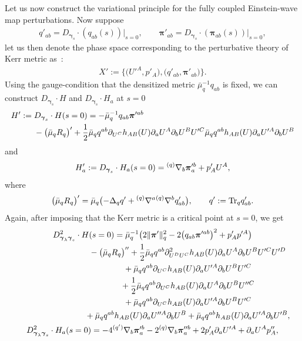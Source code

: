 \documentclass[11pt]{article}
\numberwithin{equation}{section}
\def\ptl{\partial}%
\def\mbo#1{\boldsymbol{#1}}%
\def\grad{{\nabla}}%
\newcommand{\leftexp}[2]{{\vphantom{#2}}^{#1}{#2}}
\def\halb{\frac{1}{2}}%
\numberwithin{equation}{section}
\begin{document}
 Let us now construct the variational principle for the fully coupled Einstein-wave map perturbations.
Now suppose
\begin{align*}
q'_{ab} = D_{\mbo{\gamma}_s} \cdot (q_{ab} (s)) \vert_{s=0}, \qquad \mbo{\pi}'_{ab} = D_{\mbo{\gamma}_s} \cdot (\mbo{\pi}_{ab} (s)) \vert_{s=0},
\end{align*}
let us then denote the phase space corresponding to the perturbative theory of Kerr metric as~:
\begin{align*}
X' := \bigl\{ \bigl(U'^{A}, p'_A\bigr), \bigl(q'_{ab}, \mbo{\pi}'_{ab}\bigr) \bigr\}.
\end{align*}
Using the gauge-condition that the densitized metric $\bar{\mu}^{-1}_q q_{ab}$ is fixed, we can construct $D_{\mbo{\gamma}_s} \cdot H $ and $D_{\mbo{\gamma}_s} \cdot H_a $ at $s=0$
\begin{align*}%
H':={}& D_{\mbo{\gamma}_s} \cdot H (s=0)=- \bar{\mu}^{-1}_q q_{ab} \mbo{\pi}'^{ab} \notag\\
 & - \bigl(\bar{\mu}_q R_q\bigr)'+ \halb \bar{\mu}_q q^{ab} \ptl_{U^C} h_{AB} (U) \ptl_a U^A \ptl_b U^B U'^C
\bar{\mu}_q q^{ab} h_{AB}(U) \ptl_a U'^A \ptl_b U^B
\end{align*}
and
\[
H'_a := D_{\mbo{\gamma}_s} \cdot H_a (s=0) = \leftexp{(q)}{\grad}_b \mbo{\pi}'^b_a + p'_A U^A,
\]
where
\[
\bigl(\bar{\mu}_q R_q\bigr)' = \bar{\mu}_q \bigl(- \Delta_q q' + \leftexp{(q)}{\grad}^a \leftexp{(q)}{\grad}^b q'_{ab} \bigr),\qquad q' := {\rm Tr}_q q'_{ab}.
\]
Again, after imposing that the Kerr metric is a critical point at $s=0$, we get
\begin{gather}
 D^2_{\mbo{\gamma}_\lambda \mbo{\gamma}_s} \cdot H(s=0) = \bar{\mu}^{-1}_q \bigl(2 \Vert \mbo{\pi}' \Vert_q^2 - 2\bigl(q_{ab} \mbo{\pi}'^{ab}\bigr)^2 + p'_A p'^A\bigr) \notag\\
 \hphantom{D^2_{\mbo{\gamma}_\lambda \mbo{\gamma}_s} \cdot H(s=0) =}{}
 - \bigl(\bar{\mu}_q R_q\bigr)'' + \halb \bar{\mu}_q q^{ab} \ptl^2_{U^D U^C} h_{AB}(U) \ptl_a U^A \ptl_b U^B U'^C U'^D \notag\\
 \hphantom{D^2_{\mbo{\gamma}_\lambda \mbo{\gamma}_s} \cdot H(s=0) =}{}
 + \bar{\mu}_q q^{ab} \ptl_{U^C} h_{AB}(U) \ptl_a U'^A \ptl_b U^B U'^C \notag\\
 \hphantom{D^2_{\mbo{\gamma}_\lambda \mbo{\gamma}_s} \cdot H(s=0) =}{}
 + \halb \bar{\mu}_q q^{ab} \ptl_{U^C} h_{AB}(U) \ptl_a U^A \ptl_b U^B U''^C \notag\\
 \hphantom{D^2_{\mbo{\gamma}_\lambda \mbo{\gamma}_s} \cdot H(s=0) =}{}
 + \bar{\mu}_q q^{ab} \ptl_{U^C} h_{AB} (U) \ptl_a U'^A \ptl_b U^B U'^C \notag\\
 \hphantom{D^2_{\mbo{\gamma}_\lambda \mbo{\gamma}_s} \cdot H(s=0) =}{}
 + \bar{\mu}_q q^{ab} h_{AB}(U) \ptl_a U''^A \ptl_b U^B + \bar{\mu}_q q^{ab} h_{AB} (U) \ptl_a U'^A \ptl_b U'^B ,\label{H''}\\
D^2_{\mbo{\gamma}_\lambda \mbo{\gamma}_s} \cdot H_a (s=0)
= -4 \leftexp{(q')}{\grad}_b \mbo{\pi}'^b_a -2 \leftexp{(q)}{\grad}_b \mbo{\pi}''^b_a + 2p'_A \ptl_a U'^A + \ptl_a U^A p''_A, \notag %
\end{gather}
\end{document}

